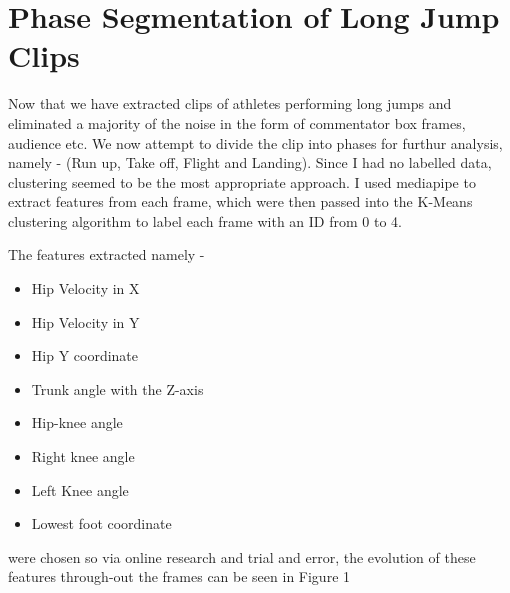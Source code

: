 \documentclass[12pt, letterpaper]{article}
\begin{document}
 \section{Phase Segmentation of Long Jump Clips}

 Now that we have extracted clips of athletes performing long jumps and eliminated a majority of the noise
 in the form of commentator box frames, audience etc. We now attempt to divide the clip into phases for furthur analysis,
 namely - (Run up, Take off, Flight and Landing). Since I had no labelled data, clustering seemed to be the most appropriate approach.
I used mediapipe to extract features from each frame, which were then passed into the K-Means clustering algorithm to label each frame with an ID from 0 to 4.

The features extracted namely -
\begin{itemize}
    \item Hip Velocity in X
    \item Hip Velocity in Y
    \item Hip Y coordinate
    \item Trunk angle with the Z-axis
    \item Hip-knee angle
    \item Right knee angle
    \item Left Knee angle
    \item Lowest foot coordinate
\end{itemize}
were chosen so via online research and trial and error, the evolution of these features through-out the frames can be seen in Figure 1
\end{document}
